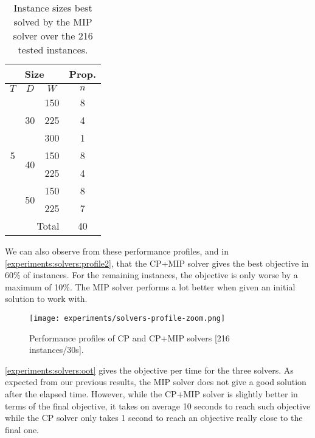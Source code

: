 \documentclass[../../thesis.tex]{subfiles}
\begin{document}
\begin{table}[H]
  \caption{Instance sizes best solved by the MIP solver over the 216 tested instances.}
  \label{instances:mip}
  \centering
  \begin{tabular}[t]{|c|c|c |c|}
    \hline
    \multicolumn{3}{|c|}{Size} & \multicolumn{1}{|c|}{Prop.} \\
    \hline 
    $T$ & $D$ & $W$ & $n$  \\
    \hline 
    \multirow{7}{*}{5} & \multirow{3}{*}{30} & 150 & 8  \\ 
    \cline{3-4}
     &  & 225 & 4  \\ 
     \cline{3-4}
     &  & 300 & 1  \\ 
     \cline{2-4}
     & \multirow{2}{*}{40} & 150 & 8  \\ 
     \cline{3-4}
     &  & 225 & 4  \\ 
     \cline{3-4}
     \cline{2-4}
     & \multirow{2}{*}{50} & 150 & 8  \\ 
     \cline{3-4}
     &  & 225 & 7  \\ 
     \hline
     \multicolumn{3}{|r|}{Total} & 40 \\
      \hline
  \end{tabular}
\end{table}

We can also observe from these performance profiles, and in \autoref{experiments:solvers:profile2}, that 
the CP+MIP solver gives the best objective in 60\% of instances. For the remaining instances, the objective is only worse by a maximum of 10\%. 
The MIP solver performs a lot better when given an initial solution to work with.


\begin{figure}
  \centering
  \texttt{[image: experiments/solvers-profile-zoom.png]}
  \caption{Performance profiles of CP and CP+MIP solvers [216 instances/30s].}
  \label{experiments:solvers:profile2}
\end{figure}



\autoref{experiments:solvers:oot} gives the objective per time for the three solvers. As expected from our previous results, the MIP solver does not 
give a good solution after the elapsed time. However, while the CP+MIP solver is slightly better in terms of the final objective, it takes on average 10 seconds 
to reach such objective while the CP solver only takes 1 second to reach an objective really close to the final one.
\end{document}
